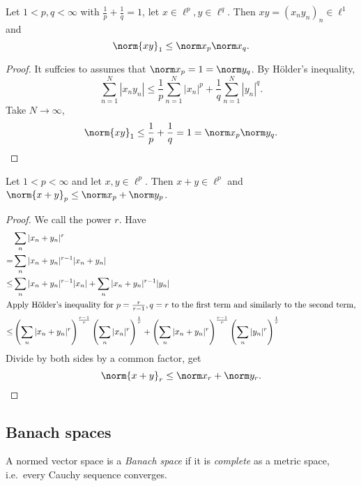 \documentclass[a4paper]{article}
\begin{document}
\begin{theorem}
  Let \(1 < p, q < \infty\) with \(\frac{1}{p} + \frac{1}{q} = 1\), let \(x \in \ell^p, y \in \ell^q\). Then \(xy = (x_ny_n)_n \in \ell^1\) and
  \[
    \norm{xy}_1 \leq \norm x_p \norm x_q.
  \]
\end{theorem}

\begin{proof}
  It suffcies to assumes that \(\norm x_p = 1 = \norm y_q\). By Hölder's inequality,
  \[
    \sum_{n = 1}^N |x_n y_n| \leq \frac{1}{p} \sum_{n = 1}^N |x_n|^p + \frac{1}{q} \sum_{n = 1}^N |y_n|^q.
  \]
  Take \(N \to \infty\),
  \[
    \norm{xy}_1 \leq \frac{1}{p} + \frac{1}{q} = 1 = \norm x_p \norm y_q.
  \]
\end{proof}

\begin{theorem}
  Let \(1 < p < \infty\) and let \(x, y \in \ell^p\). Then \(x + y \in \ell^p\) and \(\norm{x + y}_p \leq \norm x_p + \norm y_p\).
\end{theorem}

\begin{proof}
  We call the power \(r\). Have
  \begin{align*}
    & \sum_n |x_n + y_n|^r \\
    =& \sum_n |x_n + y_n|^{r - 1}|x_n + y_n| \\
    \leq& \sum_n |x_n + y_n|^{r - 1} |x_n| + \sum_n |x_n + y_n|^{r - 1} |y_n| \\
    \intertext{Apply Hölder's inequality for \(p = \frac{r}{r - 1}, q = r\) to the first term and similarly to the second term,}
    \leq& \left( \sum_n |x_n + y_n|^r \right) ^{\frac{r - 1}{r}} \left( \sum_n |x_n|^r \right)^{\frac{1}{r}} + \left( \sum_n |x_n + y_n|^r \right) ^{\frac{r - 1}{r}} \left( \sum_n |y_n|^r \right)^{\frac{1}{r}}
  \end{align*}
  Divide by both sides by a common factor, get
  \[
    \norm{x + y}_r \leq \norm x_r + \norm y_r.
  \]
\end{proof}

\subsection{Banach spaces}

\begin{definition}
  A normed vector space is a \emph{Banach space} if it is \emph{complete} as a metric space, i.e.\ every Cauchy sequence converges.
\end{definition}
\end{document}
